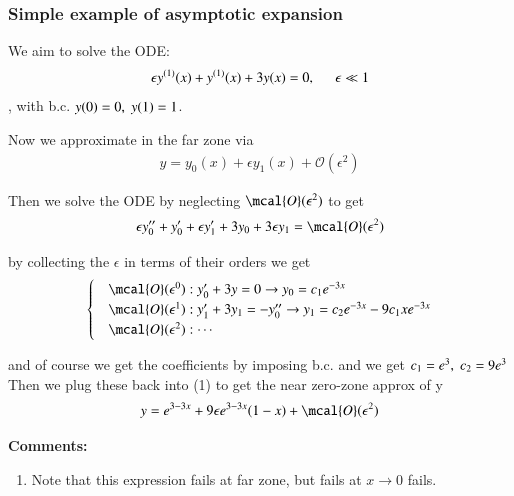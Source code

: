 \documentclass[a4paper, 12pt]{article}
\begin{document}
\subsubsection{Simple example of asymptotic expansion}%
  \label{sub:Simple example of asymptotic expansion}
 We aim to solve the ODE: 
 \begin{align}
  \label{ODE}
   \epsilon y^{(1)}(x) + y^{(1)}(x) + 3y(x) = 0, \hspace{0.5cm} \epsilon
   \ll 1
 \end{align}, with b.c. \( y(0) = 0, \hspace{0.1cm} y(1) = 1 \).
 
 Now we approximate in the far zone via 
 \begin{align}
  \label{far zone approx}
   y = y_0(x) + \epsilon y_1(x) + \mathcal{O}(\epsilon^2)
 \end{align}

 Then we solve the ODE by neglecting \( \mcal{O}(\epsilon^2) \) to get 
 \begin{align}
  \label{far zone expansion}
   \epsilon y^{\prime \prime}_{0} + y_0^{\prime} + \epsilon
   y_1^{\prime} + 3 y_0 + 3 \epsilon y_1 = \mcal{O}(\epsilon^2)
 \end{align}

 by collecting the \( \epsilon \) in terms of their orders we get 
 \begin{align}
  \label{1st case packaged}
  \begin{cases} 
    &\mcal{O}(\epsilon^0): y_{0}^{\prime} + 3y = 0 \to y_0 = c_1 e^{-3x}
    \\ 
    &\mcal{O}(\epsilon^1): y_{1}^{\prime} + 3 y_1 = -
    y_{0}^{\prime \prime} \to y_1 = c_2 e^{-3x} - 9 c_1 x e^{-3x}  \\ 
    &\mcal{O}(\epsilon^2): \cdots
  \end{cases}
 \end{align}

 and of course we get the coefficients by imposing b.c. and we get \( c_1
 = e^{3}, \hspace{0.1cm} c_2 = 9 e^3 \)
Then we plug these back into (1) to get the near zero-zone approx of y 
\begin{align}
  \label{final far zone expansion}
  y =  e^{3 - 3x} + 9 \epsilon e^{3-3x} (1 - x) +
  \mcal{O}(\epsilon^2)  
\end{align}

\textbf{Comments: }

\begin{enumerate}
  \item[\cdot] Note that this expression fails at far zone, but fails at
  \( x \to 0 \) fails. 
\end{enumerate}
\end{document}
